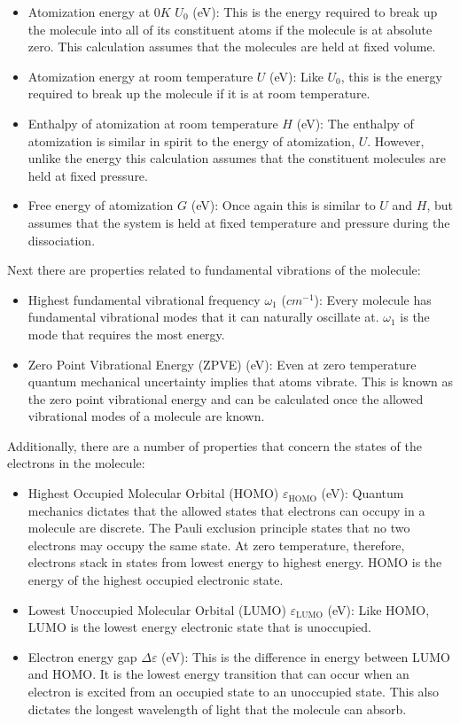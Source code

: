 \documentclass{article}
\begin{document}
\iffalse
\begin{itemize}
    \item Atomization energy at $0K$ $U_0$ (eV): This is the energy required to break up the molecule into all of its constituent atoms if the molecule is at absolute zero. This calculation assumes that the molecules are held at fixed volume.
    \item Atomization energy at room temperature $U$ (eV): Like $U_0$, this is the energy required to break up the molecule if it is at room temperature. %
    \item Enthalpy of atomization at room temperature $H$ (eV): The enthalpy of atomization is similar in spirit to the energy of atomization, $U$. However, unlike the energy this calculation assumes that the constituent molecules are held at fixed pressure.
    \item Free energy of atomization $G$ (eV): Once again this is similar to $U$ and $H$, but assumes that the system is held at fixed temperature and pressure during the dissociation. 
\end{itemize}
Next there are properties related to fundamental vibrations of the molecule:
\begin{itemize}
    \item Highest fundamental vibrational frequency $\omega_1$ ($cm^{-1}$): Every molecule has fundamental vibrational modes that it can naturally oscillate at. $\omega_1$ is the mode that requires the most energy.
    \item Zero Point Vibrational Energy (ZPVE) (eV): Even at zero temperature quantum mechanical uncertainty implies that atoms vibrate. This is known as the zero point vibrational energy and can be calculated once the allowed vibrational modes of a molecule are known.
\end{itemize}
Additionally, there are a number of properties that concern the states of the electrons in the molecule:
\begin{itemize}
    \item Highest Occupied Molecular Orbital (HOMO) $\varepsilon_{\text{HOMO}}$ (eV): Quantum mechanics dictates that the allowed states that electrons can occupy in a molecule are discrete. The Pauli exclusion principle states that no two electrons may occupy the same state. At zero temperature, therefore, electrons stack in states from lowest energy to highest energy. HOMO is the energy of the highest occupied electronic state.
    \item Lowest Unoccupied Molecular Orbital (LUMO) $\varepsilon_{\text{LUMO}}$ (eV): Like HOMO, LUMO is the lowest energy electronic state that is unoccupied.
    \item Electron energy gap $\Delta\varepsilon$ (eV): This is the difference in energy between LUMO and HOMO. It is the lowest energy transition that can occur when an electron is excited from an occupied state to an unoccupied state. This also dictates the longest wavelength of light that the molecule can absorb.
\end{itemize}
\end{document}
